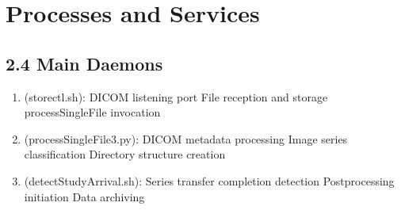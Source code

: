 \documentclass[letterpaper,10pt,english]{sphinxmanual}
\begin{document}
\section{Processes and Services}
\label{\detokenize{Temp/admin-options:processes-and-services}}

\subsection{2.4 Main Daemons}
\label{\detokenize{Temp/admin-options:main-daemons}}\begin{enumerate}
%
\item {} 
\sphinxAtStartPar
{} (storectl.sh):
\sphinxhyphen{} DICOM listening port
\sphinxhyphen{} File reception and storage
\sphinxhyphen{} processSingleFile invocation

\item {} 
\sphinxAtStartPar
{} (processSingleFile3.py):
\sphinxhyphen{} DICOM metadata processing
\sphinxhyphen{} Image series classification
\sphinxhyphen{} Directory structure creation

\item {} 
\sphinxAtStartPar
{} (detectStudyArrival.sh):
\sphinxhyphen{} Series transfer completion detection
\sphinxhyphen{} Post\sphinxhyphen{}processing initiation
\sphinxhyphen{} Data archiving

\end{enumerate}
\end{document}
